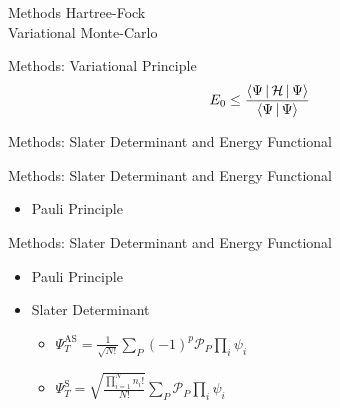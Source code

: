 \documentclass[10pt, t, xcolor=dvipsnames]{beamer}
\begin{document}
{
\begin{frame}[standout]{Methods}
    Hartree-Fock \\
    Variational Monte-Carlo
\end{frame}

{
\begin{frame}[standout]{Methods: Variational Principle}
    \begin{equation*}
        E_0 \leq \frac{\Braket{\Psi|\mathcal{H}|\Psi}}{\Braket{\Psi|\Psi}}
        \label{eq:varPrinc}
    \end{equation*}
\end{frame}

\begin{frame}[fragile]{Methods: Slater Determinant and Energy Functional}
\end{frame}

\begin{frame}[fragile]{Methods: Slater Determinant and Energy Functional}
    \begin{itemize}
        \item Pauli Principle
    \end{itemize}
\end{frame}

\begin{frame}[fragile]{Methods: Slater Determinant and Energy Functional}
    \begin{itemize}
        \item Pauli Principle
        \item Slater Determinant
            \begin{itemize}
                \item $\Psi^{\text{AS}}_T =
                    \frac{1}{\sqrt{N!}}\sum\limits_{P}(-1)^p\mathcal{P}_P\prod\limits_i\psi_i$
                \item $\Psi^{\text{S}}_T =
                    \sqrt{\frac{\prod\limits^N_{i=1}n_i!}{N!}}\sum\limits_{P}\mathcal{P}_P\prod\limits_i\psi_i$
            \end{itemize}
    \end{itemize}
\end{frame}

}}
\end{document}
